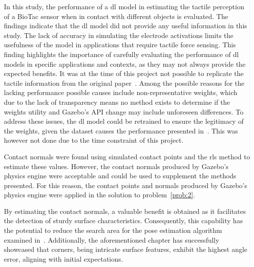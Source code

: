 In this study, the performance of a \gls{dl} model in estimating the tactile perception of a BioTac sensor when in contact with different objects is evaluated. The findings indicate that the \gls{dl} model did not provide any useful information in this study. The lack of accuracy in simulating the electrode activations limits the usefulness of the model in applications that require tactile force sensing. This finding highlights the importance of carefully evaluating the performance of \gls{dl} models in specific applications and contexts, as they may not always provide the expected benefits. It was at the time of this project not possible to replicate the tactile information from the original paper~\cite{simulation-of-the-syntouch-biotac-sensor}. Among the possible reasons for the lacking performance possible causes include non-representative weights, which due to the lack of transparency means no method exists to determine if the weights utility and Gazebo's API change may include unforeseen differences. To address these issues, the \gls{dl} model could be retrained to ensure the legitimacy of the weights, given the dataset causes the performance presented in~\cite{simulation-of-the-syntouch-biotac-sensor}. This was however not done due to the time constraint of this project.\medskip

Contact normals were found using simulated contact points and the \gls{rls} method to estimate these values. However, the contact normals produced by Gazebo's physics engine were acceptable and could be used to supplement the methods presented. For this reason, the contact points and normals produced by Gazebo's physics engine were applied in the solution to problem~\ref{prob:2}. \medskip


By estimating the contact normals, a valuable benefit is obtained as it facilitates the detection of sturdy surface characteristics. Consequently, this capability has the potential to reduce the search area for the pose estimation algorithm examined in~. Additionally, the aforementioned chapter has successfully showcased that corners, being intricate surface features, exhibit the highest angle error, aligning with initial expectations.\medskip

